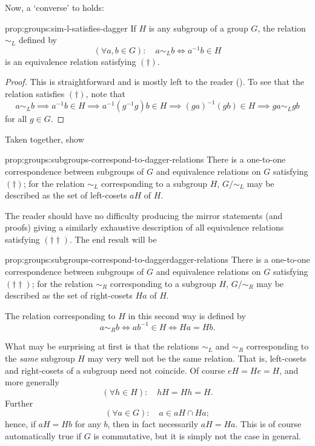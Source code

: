 Now, a `converse' to
 holds:

\begin{prop}{}{prop:groups:sim-l-satisfies-dagger}
  If $H$ is any subgroup of a group $G$, the relation
$\sim_L$ defined by
\[
  (\forall a, b \in G) : \quad a \sim_L b \iff a^{-1}b \in H
\]
is an equivalence relation satisfying
$(\dagger)$.
\end{prop}
\begin{proof}
  This is straightforward and is mostly left to the reader
  (). To see that the relation
  satisfies $(\dagger)$, note that
  \[
    a \sim_L b \implies a^{-1}b \in H \implies a^{-1}(g^{-1}g)b \in H
    \implies (ga)^{-1}(gb) \in H \implies ga \sim_L gb
  \]
  for all $g \in G$.
\end{proof}

Taken together,
 show

\begin{prop}{}{prop:groups:subgroups-correspond-to-dagger-relations}
  There is a one-to-one correspondence between subgroups of
    $G$ and equivalence relations on $G$ satisfying $(\dagger)$; for
    the relation $\sim_L$ corresponding to a subgroup $H$,
    $G/\!\sim_L$ may be described as the set of left-cosets $aH$ of
    $H$.
\end{prop}

The reader should have no difficulty producing the mirror statements
(and proofs) giving a similarly exhaustive description of all
equivalence relations satisfying $(\dagger\dagger)$. The end result
will be

\begin{prop}{}{prop:groups:subgroups-correspond-to-daggerdagger-relations}
  There is a one-to-one correspondence between subgroups of
    $G$ and equivalence relations on $G$ satisfying
    $(\dagger\dagger)$; for the relation $\sim_R$ corresponding to a
    subgroup $H$, $G/\!\sim_R$ may be described as the set of
    right-cosets $Ha$ of
    $H$.
\end{prop}
The relation corresponding to $H$ in this second way is defined by
\[
  a \sim_R b \iff ab^{-1} \in H \iff Ha = Hb.
\]

What may be surprising at first is that the relations $\sim_L$ and
$\sim_R$ corresponding to the \emph{same} subgroup $H$ may very well
not be the same relation. That is, left-cosets and right-cosets of a
subgroup need not coincide. Of course $eH = He = H$, and more
generally
\[
  (\forall h \in H) : \quad hH = Hh = H.
\]
Further
\[
  (\forall a \in G) : \quad a \in aH \cap Ha;
\]
hence, if $aH = Hb$ for any $b$, then in fact necessarily $aH = Ha$.
This is of course automatically true if $G$ is commutative, but it is
simply not the case in general.

